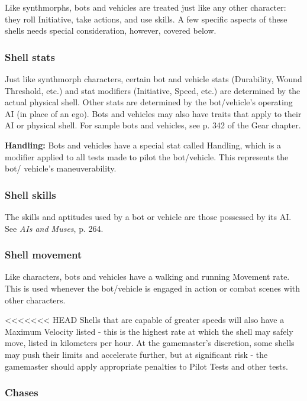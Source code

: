 Like synthmorphs, bots and vehicles are treated just like any other character: they roll Initiative, take actions, and use skills. A few specific aspects of these shells needs special consideration, however, covered below.

\subsubsection{Shell stats}

Just like synthmorph characters, certain bot and vehicle stats (Durability, Wound Threshold, etc.) and stat modifiers (Initiative, Speed, etc.) are determined by the actual physical shell. Other stats are determined by the bot/vehicle’s operating AI (in place of an ego). Bots and vehicles may also have traits that apply to their AI or physical shell. For sample bots and vehicles, see p. 342 of the Gear chapter.

\textbf{Handling:} Bots and vehicles have a special stat called Handling, which is a modifier applied to all tests made to pilot the bot/vehicle. This represents the bot/ vehicle’s maneuverability.

\subsubsection{Shell skills}

The skills and aptitudes used by a bot or vehicle are those possessed by its AI. See \emph{AIs and Muses}, p. 264.

\subsubsection{Shell movement}

Like characters, bots and vehicles have a walking and running Movement rate. This is used whenever the bot/vehicle is engaged in action or combat scenes with other characters.

<<<<<<< HEAD
Shells that are capable of greater speeds will also have a Maximum Velocity listed - this is the highest rate at which the shell may safely move, listed in kilometers per hour. At the gamemaster’s discretion, some shells may push their limits and accelerate further, but at significant risk - the gamemaster should apply appropriate penalties to Pilot Tests and other tests.

\subsubsection{Chases}

